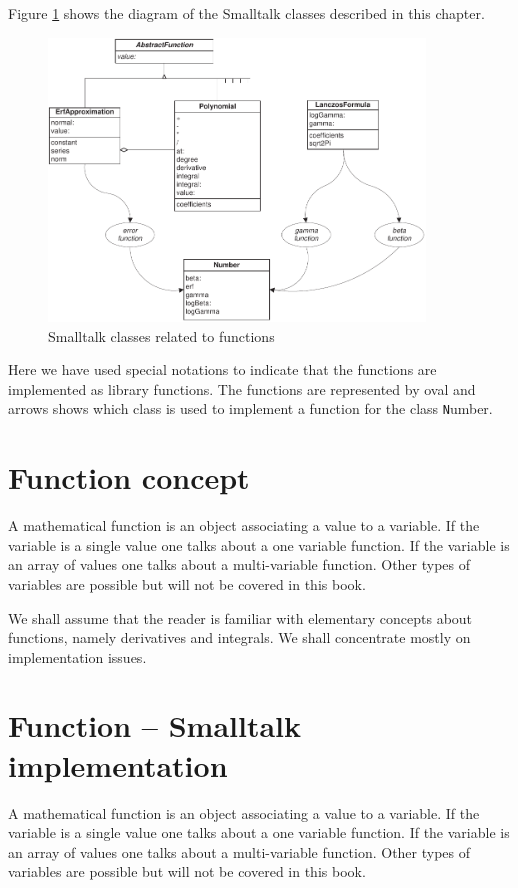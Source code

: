Figure \ref{fig:functions} shows the diagram of the Smalltalk classes
described in this chapter.
\begin{figure}
\centering\includegraphics[width=10cm]{Figures/FunctionS}
\caption{Smalltalk classes related to functions}
\label{fig:functions}
\end{figure}
Here we have used special notations to indicate that the functions
are implemented as library functions. The functions are
represented by oval and arrows shows which class is used to
implement a function for the class {\texttt Number}.

\section{Function concept}
\label{sec:function}
A mathematical function is an object
associating a value to a variable. If the variable is a single
value one talks about a one variable function. If the variable is
an array of values one talks about a multi-variable function.
Other types of variables are possible but will not be covered in
this book.

We shall assume that the reader is familiar with elementary
concepts about functions, namely derivatives and integrals. We
shall concentrate mostly on implementation issues.

\section{Function -- Smalltalk implementation}
\label{sec:stFunction}
A mathematical function is an object
associating a value to a variable. If the variable is a single
value one talks about a one variable function. If the variable is
an array of values one talks about a multi-variable function.
Other types of variables are possible but will not be covered in
this book.

